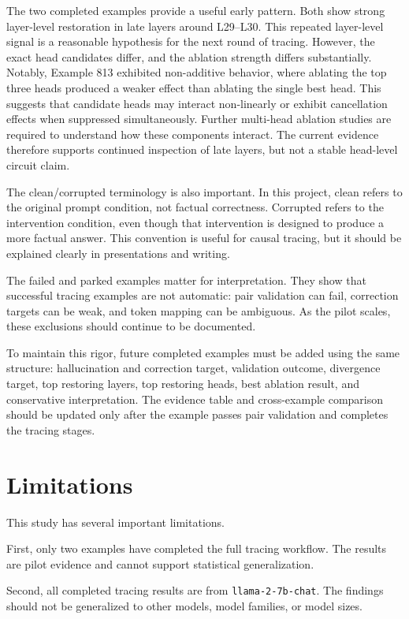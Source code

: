 \documentclass[11pt]{article}
\begin{document}
The two completed examples provide a useful early pattern. Both show strong layer-level restoration in late layers around L29--L30. This repeated layer-level signal is a reasonable hypothesis for the next round of tracing. However, the exact head candidates differ, and the ablation strength differs substantially. Notably, Example 813 exhibited non-additive behavior, where ablating the top three heads produced a weaker effect than ablating the single best head. This suggests that candidate heads may interact non-linearly or exhibit cancellation effects when suppressed simultaneously. Further multi-head ablation studies are required to understand how these components interact. The current evidence therefore supports continued inspection of late layers, but not a stable head-level circuit claim.

The clean/corrupted terminology is also important. In this project, clean refers to the original prompt condition, not factual correctness. Corrupted refers to the intervention condition, even though that intervention is designed to produce a more factual answer. This convention is useful for causal tracing, but it should be explained clearly in presentations and writing.

The failed and parked examples matter for interpretation. They show that successful tracing examples are not automatic: pair validation can fail, correction targets can be weak, and token mapping can be ambiguous. As the pilot scales, these exclusions should continue to be documented. 

To maintain this rigor, future completed examples must be added using the same structure: hallucination and correction target, validation outcome, divergence target, top restoring layers, top restoring heads, best ablation result, and conservative interpretation. The evidence table and cross-example comparison should be updated only after the example passes pair validation and completes the tracing stages.


\section{Limitations}

This study has several important limitations.

First, only two examples have completed the full tracing workflow. The results are pilot evidence and cannot support statistical generalization.

Second, all completed tracing results are from \texttt{llama-2-7b-chat}. The findings should not be generalized to other models, model families, or model sizes.
\end{document}
